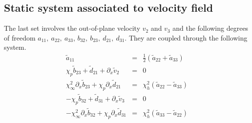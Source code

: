 \documentclass[
10pt, %
a4paper, %
oneside, %
headinclude,footinclude, %
table
]{scrartcl}
\begin{document}
\subsection{Static system associated to velocity field}
The last set involves the out-of-plane velocity $v_{2}$ and $v_{3}$ and the following  degrees of freedom $a_{11}, \ a_{22}, \ a_{33}$, $b_{32}, \ b_{23}, \ d_{21}, \ d_{31}$. They are coupled through the following system.
\begin{equation}
\begin{array}{rcl}
\tilde{a}_{11}&=&\frac{1}{2}\left(\tilde{a}_{22}+\tilde{a}_{33}\right)  \\[8pt]
 \chi_p \tilde{b}_{23}+\tilde{d}_{21}+\partial_{x}\tilde{v}_2&=&0 \\
\chi _{\infty }^2\partial_{x}\tilde{b}_{23}+\chi _p \partial_{x}\tilde{d}_{21} &=&\chi _h^2 \left(\tilde{a}_{22}-\tilde{a}_{33}\right)\\[8pt]
-\chi_p \tilde{b}_{32}+\tilde{d}_{31}+\partial_{x}\tilde{v}_3&=&0 \\
- \chi _{\infty }^2\partial_{x}\tilde{b}_{32}+\chi _p \partial_{x}\tilde{d}_{31}&=&\chi _h^2 \left(\tilde{a}_{33}-\tilde{a}_{22}\right)
\end{array}
\end{equation}   
\end{document}
